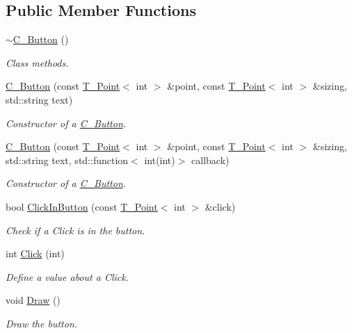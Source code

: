 \subsection*{Public Member Functions}
\begin{DoxyCompactItemize}
\item 
\hyperlink{classC__Button_a8581fb2ad14e232e97040388bdc992e4}{$\sim$\+C\+\_\+\+Button} ()
\begin{DoxyCompactList}\small\item\em Class methods. \end{DoxyCompactList}\item 
\hyperlink{classC__Button_a39291cec8e3a327343328f6fa1a3b3d9}{C\+\_\+\+Button} (const \hyperlink{classT__Point}{T\+\_\+\+Point}$<$ int $>$ \&point, const \hyperlink{classT__Point}{T\+\_\+\+Point}$<$ int $>$ \&sizing, std\+::string text)
\begin{DoxyCompactList}\small\item\em Constructor of a \hyperlink{classC__Button}{C\+\_\+\+Button}. \end{DoxyCompactList}\item 
\hyperlink{classC__Button_aed99ebc9be8ebd50a09c909eb95ec226}{C\+\_\+\+Button} (const \hyperlink{classT__Point}{T\+\_\+\+Point}$<$ int $>$ \&point, const \hyperlink{classT__Point}{T\+\_\+\+Point}$<$ int $>$ \&sizing, std\+::string text, std\+::function$<$ int(int)$>$ callback)
\begin{DoxyCompactList}\small\item\em Constructor of a \hyperlink{classC__Button}{C\+\_\+\+Button}. \end{DoxyCompactList}\item 
bool \hyperlink{classC__Button_a805c797b9afdddb5896a516a3e783882}{Click\+In\+Button} (const \hyperlink{classT__Point}{T\+\_\+\+Point}$<$ int $>$ \&click)
\begin{DoxyCompactList}\small\item\em Check if a Click is in the button. \end{DoxyCompactList}\item 
int \hyperlink{classC__Button_ac743591b5933dd95b571d5956c7d669b}{Click} (int)
\begin{DoxyCompactList}\small\item\em Define a value about a Click. \end{DoxyCompactList}\item 
void \hyperlink{classC__Button_a71f9a7d92a30818af1539104e6b963fb}{Draw} ()
\begin{DoxyCompactList}\small\item\em Draw the button. \end{DoxyCompactList}\item 

\end{DoxyCompactItemize}
